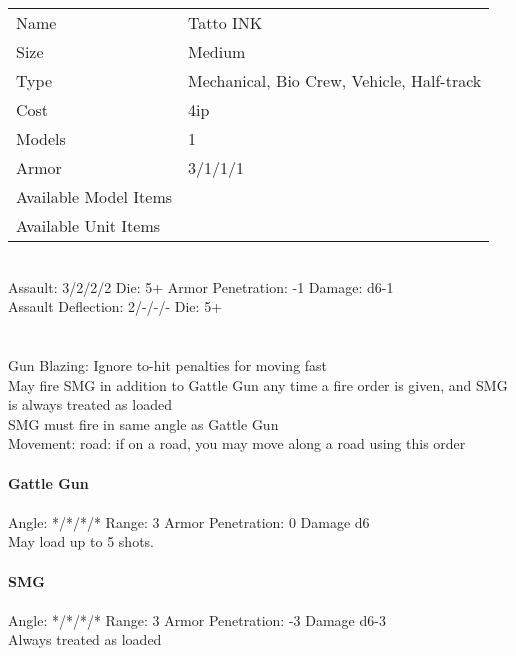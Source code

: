\begin{tabular}{ll}
  Name & Tatto INK \\
  Size & Medium\\
  Type & Mechanical, Bio Crew, Vehicle, Half-track\\
  Cost & 4ip\\
  Models & 1\\
  Armor & 3/1/1/1\\
  Available Model Items &  \\
  Available Unit Items &  \\
\end{tabular}

\ \\
Assault: 3/2/2/2 Die: 5+ Armor Penetration: -1 Damage: d6-1 \\
Assault Deflection: 2/-/-/- Die: 5+\\
\indent  \\
\ \\
Gun Blazing: Ignore to-hit penalties for moving fast\\ May fire SMG in addition to Gattle Gun any time a fire order is given, and SMG is always treated as loaded\\ SMG must fire in same angle as Gattle Gun\\ Movement: road: if on a road, you may move along a road using this order
\ \\
\ \\
{\bf Gattle Gun } \\
\ \\
Angle: */*/*/* Range: 3 Armor Penetration: 0 Damage d6 \\
\indent May load up to 5 shots. \\



\ \\
{\bf SMG } \\
\ \\
Angle: */*/*/* Range: 3 Armor Penetration: -3 Damage d6-3 \\
\indent Always treated as loaded \\





